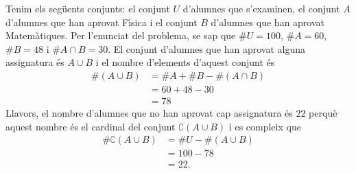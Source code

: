 \begin{solucio}
Tenim els seg\"{u}ents conjunts: el conjunt $U$ d'alumnes que s'examinen, el
conjunt $A$ d'alumnes que han aprovat F\'{\i}sica i el conjunt $B$ d'alumnes
que han aprovat Matem\`{a}tiques. Per l'enunciat del problema, se sap que $%
\#U=100$, $\#A=60$, $\#B=48$ i $\#A\cap B=30$. El conjunt d'alumnes que han
aprovat alguna assignatura \'{e}s $A\cup B$ i el nombre d'elements d'aquest
conjunt \'{e}s%
\begin{align*}
\#\left( A\cup B\right) & =\#A+\#B-\#\left( A\cap B\right) \\
& =60+48-30 \\
& =78
\end{align*}
Llavors, el nombre d'alumnes que no han aprovat cap assignatura \'{e}s $22$
perqu\`{e} aquest nombre \'{e}s el cardinal del conjunt $\complement(A\cup B)
$ i es compleix que%
\begin{align*}
\#\complement(A\cup B) & =\#U-\#\left( A\cup B\right) \\
& =100-78 \\
& =22\text{.}
\end{align*}
\end{solucio}


